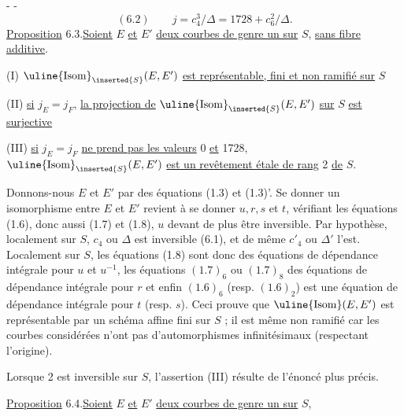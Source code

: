 -  -
\[
(6.2)\qquad j=c_4^3/\Delta=1728+c_6^2/\Delta.
\]
\uline{Proposition} 6.3.\quad \uline{Soient} $E$ \uline{et} $E'$ \uline{deux courbes de genre un sur} $S$, \uline{sans fibre additive}.

(I) $\uline{\mathrm{Isom}}_{\inserted{S}}(E,E')$ \uline{est représentable, fini et non ramifié sur} $S$

(II) \uline{si} $j_E=j_F$, \uline{la projection de} $\uline{\mathrm{Isom}}_{\inserted{S}}(E,E')$ \uline{sur} $S$ \uline{est surjective}

(III) \uline{si} $j_E=j_F$ \uline{ne prend pas les valeurs} 0 \uline{et} 1728, $\uline{\mathrm{Isom}}_{\inserted{S}}(E,E')$ \uline{est un revêtement étale de rang} 2 \uline{de} $S$.

Donnons-nous $E$ et $E'$ par des équations (1.3) et (1.3)'. Se donner un isomorphisme entre $E$ et $E'$ revient à se donner $u,r,s$ et $t$, vérifiant les équations (1.6), donc aussi (1.7) et (1.8), $u$ devant de plus être inversible. Par hypothèse, localement sur $S$, $c_4$ ou $\Delta$ est inversible (6.1), et de même $c'_4$ ou $\Delta'$ l'est. Localement sur $S$, les équations (1.8) sont donc des équations de dépendance intégrale pour $u$ et $u^{-1}$, les équations $(1.7)_6$ ou $(1.7)_8$ des équations de dépendance intégrale pour $r$ et enfin $(1.6)_6$ (resp. $(1.6)_2$) est une équation de dépendance intégrale pour $t$ (resp. $s$). Ceci prouve que $\uline{\mathrm{Isom}}(E,E')$ est représentable par un schéma affine fini sur $S$ ; il est même non ramifié car les courbes considérées n'ont pas d'automorphismes infinitésimaux (respectant l'origine).

Lorsque 2 est inversible sur $S$, l'assertion (III) résulte de l'énoncé plus précis.

\uline{Proposition} 6.4.\quad \uline{Soient} $E$ \uline{et} $E'$ \uline{deux courbes de genre un sur} $S$,

